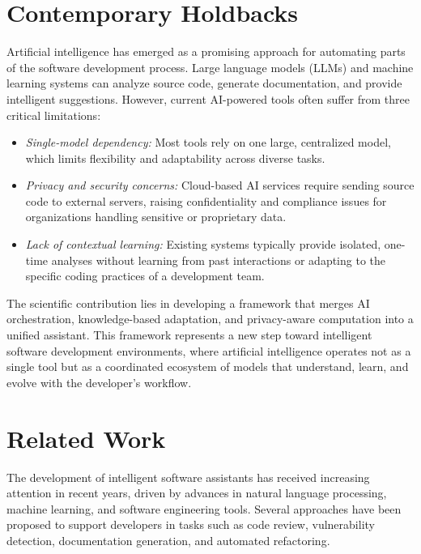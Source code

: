 \documentclass[12pt,a4paper]{article}
\begin{document}
\section{Contemporary Holdbacks}

Artificial intelligence has emerged as a promising approach for automating parts of the software development process. 
Large language models (LLMs) and machine learning systems can analyze source code, generate documentation, and provide 
intelligent suggestions. However, current AI-powered tools often suffer from three critical limitations:

\begin{itemize}[leftmargin=1.5em]
    \item \textit{Single-model dependency:} Most tools rely on one large, centralized model, which limits flexibility 
    and adaptability across diverse tasks.
    \item \textit{Privacy and security concerns:} Cloud-based AI services require sending source code to external 
    servers, raising confidentiality and compliance issues for organizations handling sensitive or proprietary data.
    \item \textit{Lack of contextual learning:} Existing systems typically provide isolated, one-time analyses without 
    learning from past interactions or adapting to the specific coding practices of a development team.
\end{itemize}

The scientific contribution lies in developing a framework that merges AI orchestration, knowledge-based adaptation, and 
privacy-aware computation into a unified assistant. This framework represents a new step toward intelligent software 
development environments, where artificial intelligence operates not as a single tool but as a coordinated ecosystem of 
models that understand, learn, and evolve with the developer’s workflow.

\section{Related Work}

The development of intelligent software assistants has received increasing attention in recent years, driven by advances 
in natural language processing, machine learning, and software engineering tools. Several approaches have been proposed 
to support developers in tasks such as code review, vulnerability detection, documentation generation, and automated 
refactoring.
\end{document}
